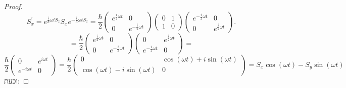 \documentclass{tstextbook}
\begin{document}
\begin{proof}
$$S_{x}^{\prime}=e^{\frac{i}{\hbar}\omega t S_{z}}S_{x}e^{-\frac{i}{\hbar}\omega t S_{z}}=\frac{\hbar}{2}\begin{pmatrix}e^{\frac{i}{2}\omega t}&0\\ 0&e^{-\frac{i}{2}\omega t}\end{pmatrix}\begin{pmatrix}0&1\\ 1&0\end{pmatrix}\begin{pmatrix}e^{-\frac{i}{2}\omega t}&0\\ 0&e^{\frac{i}{2}\omega t}\end{pmatrix}.$$$$=\frac{\hbar}{2}\begin{pmatrix}e^{\frac{i}{2}\omega t}&0\\ 0&e^{-\frac{i}{2}\omega t}\end{pmatrix}\begin{pmatrix}0&e^{\frac{i}{2}\omega t}\\ e^{-\frac{i}{2}\omega t}&0\end{pmatrix}=$$$${\frac{\hbar}{2}}\left(\begin{matrix}0&e^{i\omega t}\\ e^{-i\omega t}&0\end{matrix}\right)={\frac{\hbar}{2}}\left(\begin{matrix}0&\cos(\omega t)+i\sin(\omega t)\\ \cos(\omega t)-i\sin(\omega t)&0\end{matrix}\right)=S_{x}\cos(\omega t)-S_{y}\sin(\omega t)$$
וכעת:

\end{proof}
\end{document}

